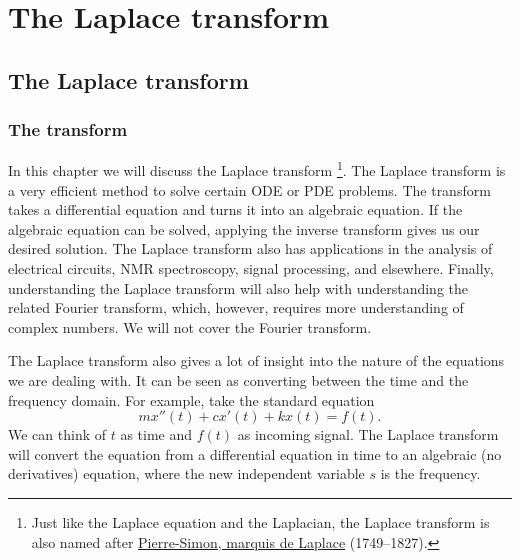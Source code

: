 \chapter{The Laplace transform} \label{LT:chapter}


\section{The Laplace transform}
\label{laplace:section}


\subsection{The transform}

In this chapter we will discuss the Laplace transform%
\footnote{Just like the Laplace equation and the Laplacian, the Laplace
transform is also named after 
\href{https://en.wikipedia.org/wiki/Laplace}{Pierre-Simon, marquis de Laplace}
(1749--1827).}.
The Laplace transform
is a very efficient method to solve certain ODE or PDE problems.
The transform takes a differential equation and turns it into
an algebraic equation.  If the algebraic equation can be solved, applying the
inverse transform gives us our desired solution.
The Laplace transform also has applications in
the analysis of 
electrical circuits, NMR spectroscopy, signal processing, and elsewhere.
Finally,
understanding the Laplace
transform will also help with understanding the related Fourier transform,
which, however, requires more
understanding of complex numbers.  We will not cover the Fourier transform.

The Laplace transform also gives a lot of insight into the nature of the
equations we are dealing with.  It can be seen as converting between the time
and the frequency domain.  For example, take the standard equation
\begin{equation*}
m x''(t) + c x'(t) + k x(t) = f(t) .
\end{equation*}
We can think of $t$ as time and $f(t)$ as incoming signal.  The Laplace
transform will convert the equation from a differential equation in time to
an algebraic (no derivatives) equation, where the new independent variable
$s$ is the frequency.

